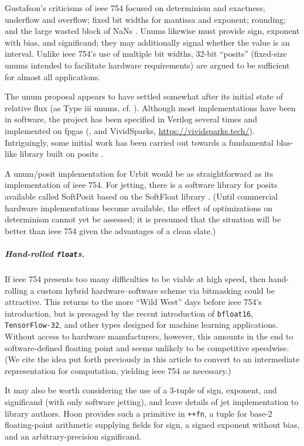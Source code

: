 \documentclass[twoside]{article}
\begin{document}
Gustafson's criticisms of {\sc ieee} 754 focused on determinism and exactness; underflow and overflow; fixed bit widths for mantissa and exponent; rounding; and the large wasted block of NaNs \citep{Risse2016}.  Unums likewise must provide sign, exponent with bias, and significand; they may additionally signal whether the value is an interval.  Unlike {\sc ieee} 754's use of multiple bit widths, 32-bit ``posits'' (fixed-size unums intended to facilitate hardware requirements) are argued to be sufficient for almost all applications.

The unum proposal appears to have settled somewhat after its initial state of relative flux (as Type {\sc iii} unums, cf. \citet{Posit2022}).  Although most implementations have been in software, the project has been specified in Verilog several times and implemented on {\sc fpga}s (\citet{Chen2018}, and VividSparks, \url{https://vividsparks.tech/}).  Intriguingly, some initial work has been carried out towards a fundamental {\sc blas}-like library built on posits \citep{vanDam2019}.

A unum/posit implementation for Urbit would be as straightforward as its implementation of {\sc ieee} 754.  For jetting, there is a software library for posits available called SoftPosit based on the SoftFloat library \citep{Cerlane2018}.  (Until commercial hardware implementations become available, the effect of optimizations on determinism cannot yet be assessed; it is presumed that the situation will be better than {\sc ieee} 754 given the advantages of a clean slate.)

\subparagraph{Hand-rolled \texttt{float}s.}

If {\sc ieee} 754 presents too many difficulties to be viable at high speed, then hand-rolling a custom hybrid hardware–software scheme via bitmasking could be attractive.  This returns to the more “Wild West” days before {\sc ieee} 754's introduction, but is presaged by the recent introduction of \texttt{bfloat16}, \texttt{TensorFlow-32}, and other types designed for machine learning applications.  Without access to hardware manufacturers, however, this amounts in the end to software-defined floating point and seems unlikely to be competitive speedwise.  (We cite the idea put forth previously in this article to convert to an intermediate representation for computation, yielding {\sc ieee} 754 as necessary.)

It may also be worth considering the use of a 3-tuple of sign, exponent, and significand (with only software jetting), and leave details of jet implementation to library authors.  Hoon provides such a primitive in \lstinline[style=inlinecode]{++fn}, a tuple for base-2 floating-point arithmetic supplying fields for sign, a signed exponent without bias, and an arbitrary-precision significand.
\end{document}
